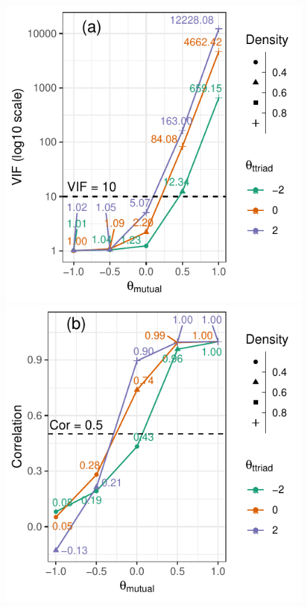 \documentclass[12pt]{article}
\begin{document}
\begin{figure}
  \begin{minipage}
    {.5\linewidth}
    \centering
    \includegraphics[width = 1\linewidth]{figures/vif-n=5.pdf}
  \end{minipage}
  \begin{minipage}
    {.5\linewidth}
    \centering
    \includegraphics[width = 1\linewidth]{figures/cor-n=5.pdf}

\end{minipage}
\end{figure}
\end{document}
